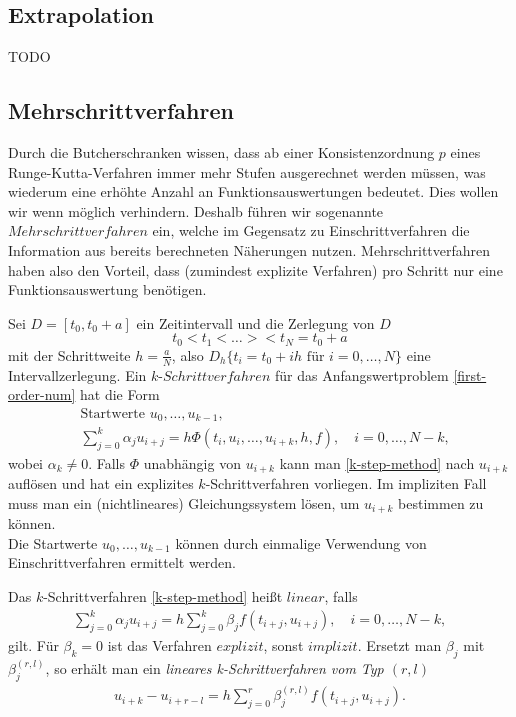\subsection{Extrapolation}
TODO

\subsection{Mehrschrittverfahren}
Durch die Butcherschranken wissen, dass ab einer Konsistenzordnung $p$ eines Runge-Kutta-Verfahren immer mehr Stufen
ausgerechnet werden müssen, was wiederum eine erhöhte Anzahl an Funktionsauswertungen bedeutet. Dies wollen wir wenn
möglich verhindern. Deshalb führen wir sogenannte $Mehrschrittverfahren$ ein, welche im Gegensatz zu Einschrittverfahren
die Information aus bereits berechneten Näherungen nutzen. Mehrschrittverfahren haben also den Vorteil, dass
(zumindest explizite Verfahren) pro Schritt nur eine Funktionsauswertung benötigen.
\begin{definition}
    Sei $D = \left[ t_0, t_0 +a \right]$ ein Zeitintervall und die Zerlegung von $D$
    \[
        t_0 < t_1 < \dots >< t_N = t_0 + a
    \]
    mit der Schrittweite $h = \frac{a}{N}$, also $D_h \{ t_i = t_0 + ih \text{ für } i = 0, \dots, N\}$ eine
    Intervallzerlegung. Ein $k$-$Schrittverfahren$ für das Anfangswertproblem \eqref{first-order-num} hat die Form
    \begin{align}
        \label{k-step-method}
        &\text{Startwerte } u_0, \dots, u_{k-1}, \nonumber \\
        & \sum_{j=0}^{k} \alpha_j u_{i+j} = h \Phi(t_i, u_i, \dots, u_{i+k},h,f), \quad i=0,\dots,N-k,
    \end{align}
    wobei $\alpha_k \neq 0$. Falls $\Phi$ unabhängig von $u_{i+k}$ kann man \eqref{k-step-method} nach $u_{i+k}$
    auflösen und hat ein explizites $k$-Schrittverfahren vorliegen. Im impliziten Fall muss man ein (nichtlineares)
    Gleichungssystem lösen, um $u_{i+k}$ bestimmen zu können.\\
    Die Startwerte $u_0, \dots, u_{k-1}$ können durch einmalige Verwendung von Einschrittverfahren ermittelt werden.
\end{definition}
\begin{definition}
    Das $k$-Schrittverfahren \eqref{k-step-method} heißt $linear$, falls
    \begin{align}
        \label{k-step-linear}
        \sum_{j=0}^{k} \alpha_j u_{i+j} = h \sum_{j=0}^{k} \beta_j f(t_{i+j}, u_{i+j}), \quad i = 0, \dots, N-k,
    \end{align}
    gilt. Für $\beta_k = 0$ ist das Verfahren $explizit$, sonst $implizit$.
    Ersetzt man $\beta_j$ mit $\beta_j^{(r,l)}$, so erhält man ein \textit{lineares k-Schrittverfahren vom Typ $(r,l)$}
    \begin{align}
        \label{k-step-rl}
        u_{i+k}-u_{i+r-l} = h \sum_{j=0}^{r} \beta_j^{(r,l)} f(t_{i+j},u_{i+j}).
    \end{align}

\end{definition}


